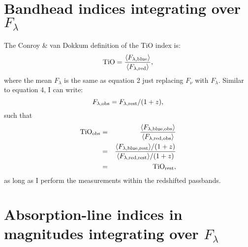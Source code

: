 \documentclass[a4paper]{article}
\begin{document}
\section{Bandhead indices integrating over $F_\lambda$}

The Conroy \& van Dokkum definition of the TiO index is:
%
\begin{equation}
{\rm TiO} = \frac{\langle F_{\lambda,{\rm blue}}\rangle}{\langle F_{\lambda,{\rm red}}\rangle},
\end{equation}
%
where the mean $F_\lambda$ is the same as equation 2 just replacing $F_\nu$ with $F_\lambda$.  Similar to equation 4, I can write:
%
\begin{equation}
F_{\lambda,{\rm obs}} = F_{\lambda,{\rm rest}} / (1+z),
\end{equation}
%
such that
%
\begin{eqnarray}
{\rm TiO}_{\rm obs} & = & \frac{\langle F_{\lambda,{\rm blue,obs}}\rangle}{\langle F_{\lambda,{\rm red,obs}}\rangle} \\
 & = &  \frac{\langle F_{\lambda,{\rm blue,rest}}\rangle/(1+z)}{\langle F_{\lambda,{\rm red,rest}}\rangle/(1+z)} \\
 & = & {\rm TiO}_{\rm rest},
\end{eqnarray}
%
as long as I perform the measurements within the redshifted passbands.

\section{Absorption-line indices in magnitudes integrating over $F_\lambda$}
\end{document}
